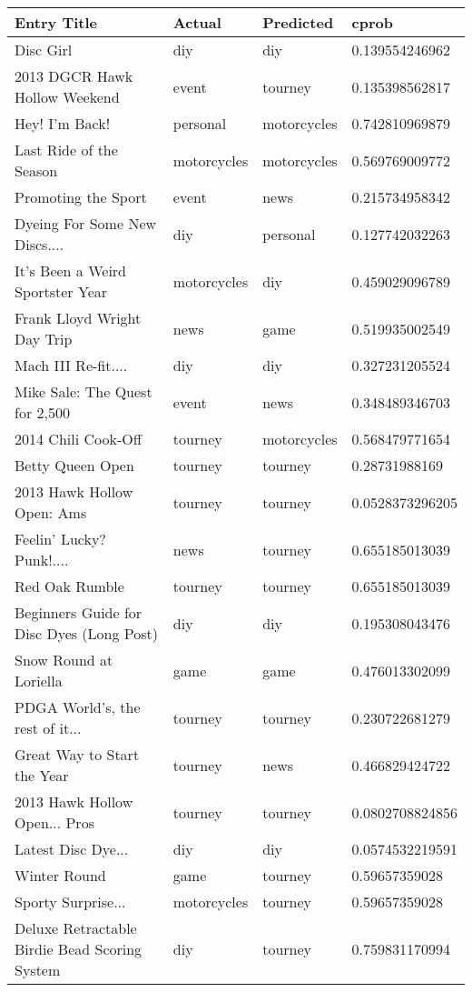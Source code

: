 \begin{table}[h!]
\centering
\begin{tabular}{| l | l | l | l |}
\hline
Entry Title & Actual & Predicted & cprob \\
\hline
Disc Girl & diy & diy & 0.139554246962 \\
2013 DGCR Hawk Hollow Weekend & event & tourney & 0.135398562817 \\
Hey! I'm Back! & personal & motorcycles & 0.742810969879 \\
Last Ride of the Season & motorcycles & motorcycles & 0.569769009772 \\
Promoting the Sport & event & news & 0.215734958342 \\
Dyeing For Some New Discs.... & diy & personal & 0.127742032263 \\
It's Been a Weird Sportster Year & motorcycles & diy & 0.459029096789 \\
Frank Lloyd Wright Day Trip & news & game & 0.519935002549 \\
Mach III Re-fit.... & diy & diy & 0.327231205524 \\
Mike Sale: The Quest for 2,500 & event & news & 0.348489346703 \\
2014 Chili Cook-Off & tourney & motorcycles & 0.568479771654 \\
Betty Queen Open & tourney & tourney & 0.28731988169 \\
2013 Hawk Hollow Open: Ams & tourney & tourney & 0.0528373296205 \\
Feelin' Lucky?     Punk!.... & news & tourney & 0.655185013039 \\
Red Oak Rumble & tourney & tourney & 0.655185013039 \\
Beginners Guide for Disc Dyes (Long Post) & diy & diy & 0.195308043476 \\
Snow Round at Loriella & game & game & 0.476013302099 \\
PDGA World's, the rest of it... & tourney & tourney & 0.230722681279 \\
Great Way to Start the Year & tourney & news & 0.466829424722 \\
2013 Hawk Hollow Open... Pros & tourney & tourney & 0.0802708824856 \\
Latest Disc Dye... & diy & diy & 0.0574532219591 \\
Winter Round & game & tourney & 0.59657359028 \\
Sporty Surprise... & motorcycles & tourney & 0.59657359028 \\
Deluxe Retractable Birdie Bead Scoring System & diy & tourney & 0.759831170994 \\

\end{tabular}
\end{table}

